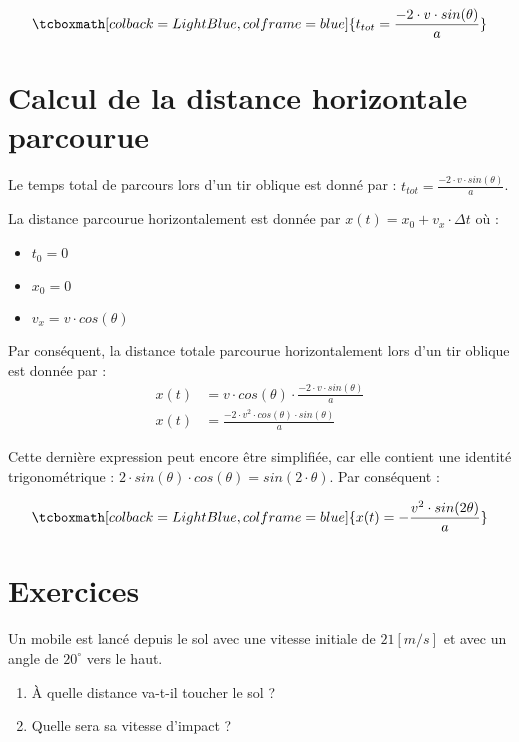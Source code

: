 \begin{equation}
    \tcboxmath[colback=LightBlue,colframe=blue]{t_{tot}=\frac{-2 \cdot v \cdot sin(\theta)}{a}}
\end{equation}

\section{Calcul de la distance horizontale parcourue}
Le temps total de parcours lors d'un tir oblique est donné par : \(t_{tot}=\frac{-2 \cdot v \cdot sin(\theta)}{a}\).

La distance parcourue horizontalement est donnée par \(x(t)=x_0+v_x \cdot \Delta t\) où :
\begin{itemize}[label=\textbullet]
    \item \(t_0=0\)
    \item \(x_0=0\)
    \item \(v_x=v \cdot cos(\theta)\)
\end{itemize}

Par conséquent, la distance totale parcourue horizontalement lors d'un tir oblique est donnée par :
\begin{align}
    x(t) & =v \cdot cos(\theta) \cdot \frac{-2 \cdot v \cdot sin(\theta)}{a} \\
    x(t) & =\frac{-2 \cdot v^2 \cdot cos(\theta) \cdot sin(\theta)}{a}
\end{align}

Cette dernière expression peut encore être simplifiée, car elle contient une identité trigonométrique : \(2 \cdot sin(\theta) \cdot cos(\theta)=sin(2 \cdot \theta )\).
Par conséquent :

\begin{equation}
    \tcboxmath[colback=LightBlue,colframe=blue]
    {x(t)=-\frac{v^2 \cdot sin(2 \theta)}{a}}
\end{equation}

\newpage

\section{Exercices}
\begin{exercise}
    Un mobile est lancé depuis le sol avec une vitesse initiale de \(21\unit{[m/s]}\) et avec un angle de \(20^{\circ}\) vers le haut.
    \begin{enumerate}[label=\alph*)]
        \item À quelle distance va-t-il toucher le sol ?
        \item Quelle sera sa vitesse d'impact ?
    \end{enumerate}
\end{exercise}

